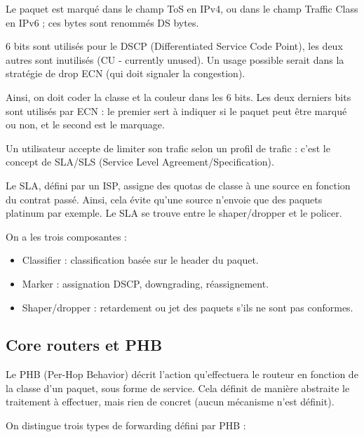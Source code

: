 			Le paquet est marqué dans le champ ToS en IPv4, ou dans le champ Traffic Class en IPv6 ; ces bytes sont renommés DS bytes.
			
			
			6 bits sont utilisés pour le DSCP (Differentiated Service Code Point), les deux autres sont inutilisés (CU - currently unused). Un usage possible serait dans la stratégie de drop ECN (qui doit signaler la congestion).
			
			Ainsi, on doit coder la classe et la couleur dans les 6 bits. Les deux derniers bits sont utilisés par ECN : le premier sert à indiquer si le paquet peut être marqué ou non, et le second est le marquage.
			
			Un utilisateur accepte de limiter son trafic selon un profil de trafic : c'est le concept de SLA/SLS (Service Level Agreement/Specification).
			
			Le SLA, défini par un ISP, assigne des quotas de classe à une source en fonction du contrat passé. Ainsi, cela évite qu'une source n'envoie que des paquets platinum par exemple. Le SLA se trouve entre le shaper/dropper et le policer.
			
			
			On a les trois composantes :
			
			\begin{itemize}
				\item Classifier : classification basée sur le header du paquet.
				\item Marker : assignation DSCP, downgrading, réassignement.
				\item Shaper/dropper : retardement ou jet des paquets s'ils ne sont pas conformes.
			\end{itemize}
		

		
		 
		
			\subsection{Core routers et PHB}
			
			Le PHB (Per-Hop Behavior) décrit l'action qu'effectuera le routeur en fonction de la classe d'un paquet, sous forme de service. Cela définit de manière abstraite le traitement à effectuer, mais rien de concret (aucun mécanisme n'est définit).
			
			On distingue trois types de forwarding défini par PHB :
			

